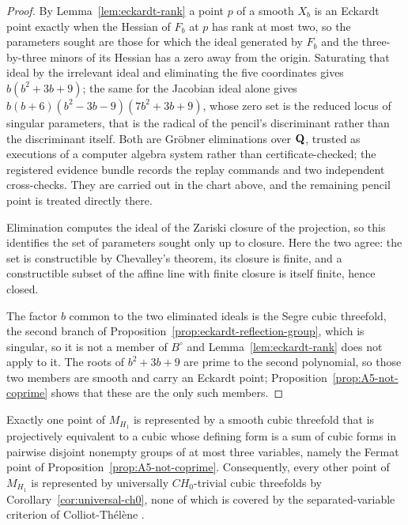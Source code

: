\begin{proof}
By Lemma~\ref{lem:eckardt-rank} a point \(p\) of a smooth \(X_b\) is an
Eckardt point exactly when the Hessian of \(F_b\) at \(p\) has rank at most
two, so the parameters sought are those for which the ideal generated by
\(F_b\) and the three-by-three minors of its Hessian has a zero away from the
origin.
Saturating that ideal by the irrelevant ideal and eliminating the five
coordinates gives \(b(b^2+3b+9)\); the same for the Jacobian ideal alone gives
\(b(b+6)(b^2-3b-9)(7b^2+3b+9)\), whose zero set is the reduced locus of
singular parameters, that is the radical of the pencil's discriminant rather
than the discriminant itself.  Both are Gr\"obner eliminations over \(\mathbf Q\),
trusted as executions of a computer algebra system rather than
certificate-checked; the registered evidence bundle records the replay
commands and two independent cross-checks.  They are carried out in the chart
above, and the remaining pencil point is treated directly there.

Elimination computes the ideal of the Zariski closure of the projection, so
this identifies the set of parameters sought only up to closure.  Here the two
agree: the set is constructible by Chevalley's theorem, its closure is finite,
and a constructible subset of the affine line with finite closure is itself
finite, hence closed.

The factor \(b\) common to the two eliminated ideals is the Segre cubic
threefold, the second branch of
Proposition~\ref{prop:eckardt-reflection-group}, which is singular, so it is
not a member of \(B^\circ\) and Lemma~\ref{lem:eckardt-rank} does not apply to
it.  The roots of \(b^2+3b+9\)
are prime to the second polynomial, so those two members are smooth and carry
an Eckardt point; Proposition~\ref{prop:A5-not-coprime} shows that these are
the only such members.
%
\end{proof}

\begin{proposition}
\label{prop:A5-nonseparated}
%
%
Exactly one point of \(M_{H_1}\) is
represented by a smooth cubic threefold that is
projectively equivalent to a cubic whose defining form is a sum of cubic
forms in pairwise disjoint nonempty groups of at most three variables, namely
the Fermat point of Proposition~\ref{prop:A5-not-coprime}.
Consequently, every other point of \(M_{H_1}\) is represented
by universally \(CH_0\)-trivial cubic threefolds by
Corollary~\ref{cor:universal-ch0}, none of which is covered by the
separated-variable criterion of Colliot-Th\'el\`ene \cite{CT}.
\end{proposition}

